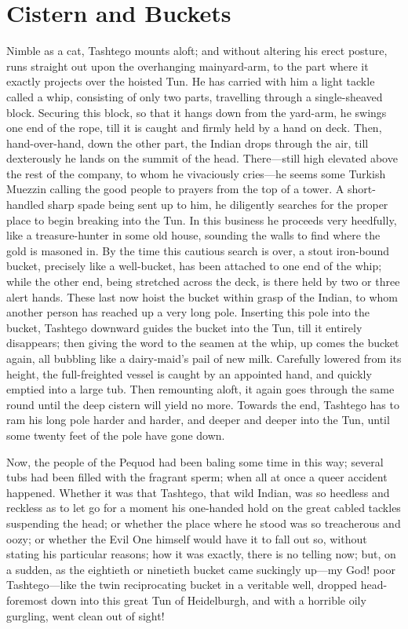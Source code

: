\documentclass{article}
\begin{document}
\section{Cistern and Buckets}


 Nimble as a cat, Tashtego mounts aloft; and without altering his erect posture, runs straight out upon the overhanging mainyard-arm, to the part where it exactly projects over the hoisted Tun. He has carried with him a light tackle called a whip, consisting of only two parts, travelling through a single-sheaved block. Securing this block, so that it hangs down from the yard-arm, he swings one end of the rope, till it is caught and firmly held by a hand on deck. Then, hand-over-hand, down the other part, the Indian drops through the air, till dexterously he lands on the summit of the head. There—still high elevated above the rest of the company, to whom he vivaciously cries—he seems some Turkish Muezzin calling the good people to prayers from the top of a tower. A short-handled sharp spade being sent up to him, he diligently searches for the proper place to begin breaking into the Tun. In this business he proceeds very heedfully, like a treasure-hunter in some old house, sounding the walls to find where the gold is masoned in. By the time this cautious search is over, a stout iron-bound bucket, precisely like a well-bucket, has been attached to one end of the whip; while the other end, being stretched across the deck, is there held by two or three alert hands. These last now hoist the bucket within grasp of the Indian, to whom another person has reached up a very long pole. Inserting this pole into the bucket, Tashtego downward guides the bucket into the Tun, till it entirely disappears; then giving the word to the seamen at the whip, up comes the bucket again, all bubbling like a dairy-maid's pail of new milk. Carefully lowered from its height, the full-freighted vessel is caught by an appointed hand, and quickly emptied into a large tub. Then remounting aloft, it again goes through the same round until the deep cistern will yield no more. Towards the end, Tashtego has to ram his long pole harder and harder, and deeper and deeper into the Tun, until some twenty feet of the pole have gone down.

Now, the people of the Pequod had been baling some time in this way; several tubs had been filled with the fragrant sperm; when all at once a queer accident happened. Whether it was that Tashtego, that wild Indian, was so heedless and reckless as to let go for a moment his one-handed hold on the great cabled tackles suspending the head; or whether the place where he stood was so treacherous and oozy; or whether the Evil One himself would have it to fall out so, without stating his particular reasons; how it was exactly, there is no telling now; but, on a sudden, as the eightieth or ninetieth bucket came suckingly up—my God! poor Tashtego—like the twin reciprocating bucket in a veritable well, dropped head-foremost down into this great Tun of Heidelburgh, and with a horrible oily gurgling, went clean out of sight!
\end{document}
